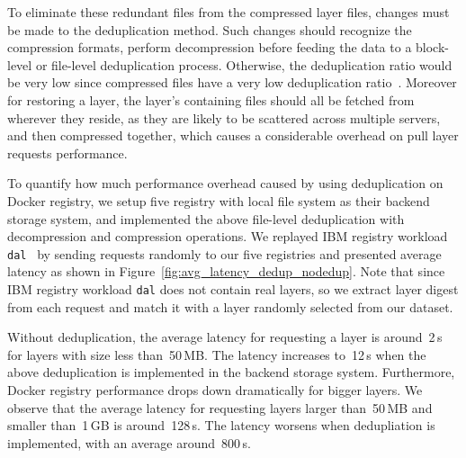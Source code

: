 To eliminate these redundant files from the compressed layer files, 
changes must be made to the deduplication method. 
Such changes should recognize the compression formats, perform decompression before feeding the data to a block-level or file-level deduplication process. 
Otherwise, the deduplication ratio would be very low since compressed files have a very low deduplication ratio~\cite{meister2012study}. %
Moreover for restoring a layer, the layer's
containing files should all be fetched from wherever they reside, as they are likely to be scattered across multiple servers, 
and then compressed together, which causes a considerable overhead on pull layer requests performance.

To quantify how much performance overhead caused by using deduplication on Docker registry,
we setup five registry with local file system as their backend storage system,
and implemented the above file-level deduplication with decompression and compression operations.
We replayed IBM registry workload \texttt{dal}~\cite{dockerworkload} 
by sending requests randomly to our five registries and presented average latency 
as shown in Figure~\ref{fig:avg_latency_dedup_nodedup}.
Note that since IBM registry workload \texttt{dal} does not contain real layers, so
we extract layer digest from each request and match it with a layer randomly selected from our dataset.

Without deduplication,
the average latency for requesting a layer is around~2\,s for layers with size less than~50\,MB.
The latency increases to~12\,s when the above deduplication is implemented in the backend storage system.
Furthermore, Docker registry performance drops down dramatically for bigger layers.
We observe that the average latency for requesting layers larger than~50\,MB and smaller than~1\,GB
is around~128\,s. The latency worsens when dedupliation is implemented, with an average around~800\,s.




